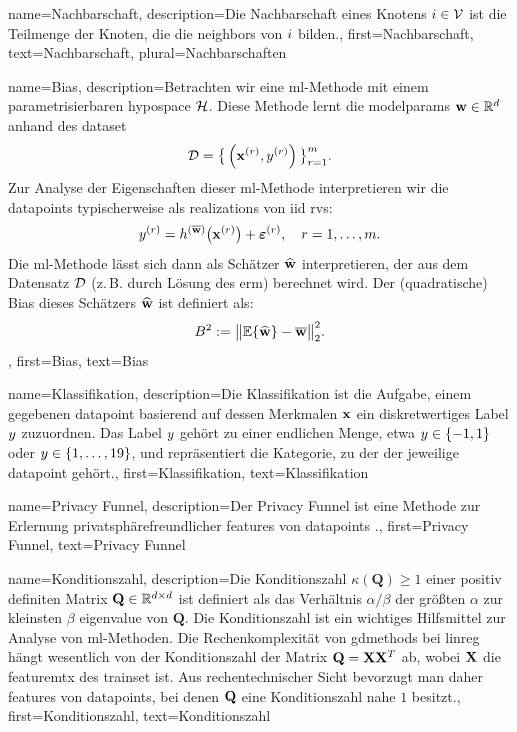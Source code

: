 {{{
{
	name={Nachbarschaft},
	description={Die  Nachbarschaft eines Knotens $i \in \mathcal{V}$ 
		ist die Teilmenge der Knoten, die die \gls{neighbors} von $i$ bilden.},
	first={Nachbarschaft}, text={Nachbarschaft}, plural={Nachbarschaften}
}

{
	name={Bias},
	description={Betrachten wir eine  \gls{ml}-Methode mit einem parametrisierbaren \gls{hypospace} $\mathcal{H}$. 
		Diese Methode lernt die \glspl{modelparam} ${\bf w} \in \mathbb{R}^{d}$ anhand des \gls{dataset}
		\[
		\mathcal{D} = \big\{ \left( {\bf x}^{(r)},y^{(r)} \right) \big\}_{r=1}^{m}.
		\]
		Zur Analyse der Eigenschaften dieser \gls{ml}-Methode interpretieren wir die \gls{datapoint}s typischerweise 
		als \gls{realization}s von \gls{iid} \gls{rv}s:
		\[
		y^{(r)} = h^{(\overline{{\bf w}})}\big( {\bf x}^{(r)} \big) + \bm{\varepsilon}^{(r)}, 
		\quad r=1,\ldots,m.
		\]
		Die \gls{ml}-Methode lässt sich dann als Schätzer $\widehat{{\bf w}}$ interpretieren, der aus dem Datensatz $\mathcal{D}$ 
		(z.\,B. durch Lösung des \gls{erm}) berechnet wird. Der (quadratische) Bias dieses Schätzers $\widehat{{\bf w}}$ ist definiert als:
		\[
		B^{2} := \big\| \mathbb{E} \{ \widehat{{\bf w}} \} - \overline{{\bf w}} \big\|_{2}^{2}.
		\]},
	first={Bias}, text={Bias}
}


{
	name={Klassifikation},
	description={Die  Klassifikation ist die Aufgabe, einem gegebenen 
		\gls{datapoint} basierend auf dessen Merkmalen ${\bf x}$ ein diskretwertiges Label $y$ 
		zuzuordnen. Das Label $y$ gehört zu einer endlichen Menge, etwa 
		$y \in \{-1,1\}$ oder $y \in \{1,\ldots,19\}$, und repräsentiert die Kategorie, 
		zu der der jeweilige \gls{datapoint} gehört.},
	first={Klassifikation}, text={Klassifikation}

}

{
	name={Privacy Funnel},
	description={Der  Privacy Funnel ist eine Methode zur Erlernung 
		privatsphärefreundlicher \gls{feature}s von \gls{datapoint}s \cite{PrivacyFunnel}.},
	first={Privacy Funnel}, text={Privacy Funnel}
}

{
	name={Konditionszahl},
	description={Die  Konditionszahl $\kappa(\mathbf{Q}) \geq 1$ einer positiv definiten 
		Matrix $\mathbf{Q} \in \mathbb{R}^{d \times d}$ ist definiert als das Verhältnis 
		$\alpha / \beta$ der größten $\alpha$ zur kleinsten $\beta$ \gls{eigenvalue} von $\mathbf{Q}$. 
		Die Konditionszahl ist ein wichtiges Hilfsmittel zur Analyse von \gls{ml}-Methoden. 
		Die Rechenkomplexität von \gls{gdmethods} bei \gls{linreg} hängt wesentlich von der 
		Konditionszahl der Matrix $\mathbf{Q} = {\bf X} {\bf X}^{T}$ ab, wobei ${\bf X}$ die \gls{featuremtx} 
		des \gls{trainset} ist. Aus rechentechnischer Sicht bevorzugt man daher \gls{feature}s 
		von \gls{datapoint}s, bei denen $\mathbf{Q}$ eine Konditionszahl nahe $1$ besitzt.},
	first={Konditionszahl}, text={Konditionszahl}
}

}}}
